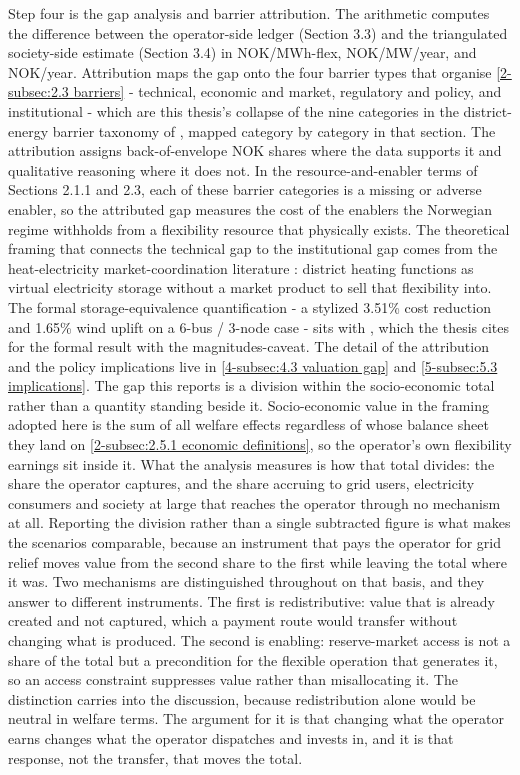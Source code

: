 Step four is the gap analysis and barrier attribution. The arithmetic computes the difference between the operator-side ledger (Section 3.3) and the triangulated society-side estimate (Section 3.4) in NOK/MWh-flex, NOK/MW/year, and NOK/year. Attribution maps the gap onto the four barrier types that organise \autoref{2-subsec:2.3 barriers} - technical, economic and market, regulatory and policy, and institutional - which are this thesis's collapse of the nine categories in the district-energy barrier taxonomy of \cite{sneum_barriers_2021}, mapped category by category in that section. The attribution assigns back-of-envelope NOK shares where the data supports it and qualitative reasoning where it does not. In the resource-and-enabler terms of Sections 2.1.1 and 2.3, each of these barrier categories is a missing or adverse enabler, so the attributed gap measures the cost of the enablers the Norwegian regime withholds from a flexibility resource that physically exists. The theoretical framing that connects the technical gap to the institutional gap comes from the heat-electricity market-coordination literature \cite{mitridati_heat_2020}: district heating functions as virtual electricity storage without a market product to sell that flexibility into. The formal storage-equivalence quantification - a stylized 3.51\% cost reduction and 1.65\% wind uplift on a 6-bus / 3-node case - sits with \cite{mitridati_power_2018}, which the thesis cites for the formal result with the magnitudes-caveat. The detail of the attribution and the policy implications live in \autoref{4-subsec:4.3 valuation gap} and \autoref{5-subsec:5.3 implications}.  The gap this reports is a division within the socio-economic total rather than a quantity standing beside it. Socio-economic value in the framing adopted here is the sum of all welfare effects regardless of whose balance sheet they land on \autoref{2-subsec:2.5.1 economic definitions}, so the operator's own flexibility earnings sit inside it. What the analysis measures is how that total divides: the share the operator captures, and the share accruing to grid users, electricity consumers and society at large that reaches the operator through no mechanism at all. Reporting the division rather than a single subtracted figure is what makes the scenarios comparable, because an instrument that pays the operator for grid relief moves value from the second share to the first while leaving the total where it was.  Two mechanisms are distinguished throughout on that basis, and they answer to different instruments. The first is redistributive: value that is already created and not captured, which a payment route would transfer without changing what is produced. The second is enabling: reserve-market access is not a share of the total but a precondition for the flexible operation that generates it, so an access constraint suppresses value rather than misallocating it. The distinction carries into the discussion, because redistribution alone would be neutral in welfare terms. The argument for it is that changing what the operator earns changes what the operator dispatches and invests in, and it is that response, not the transfer, that moves the total.


